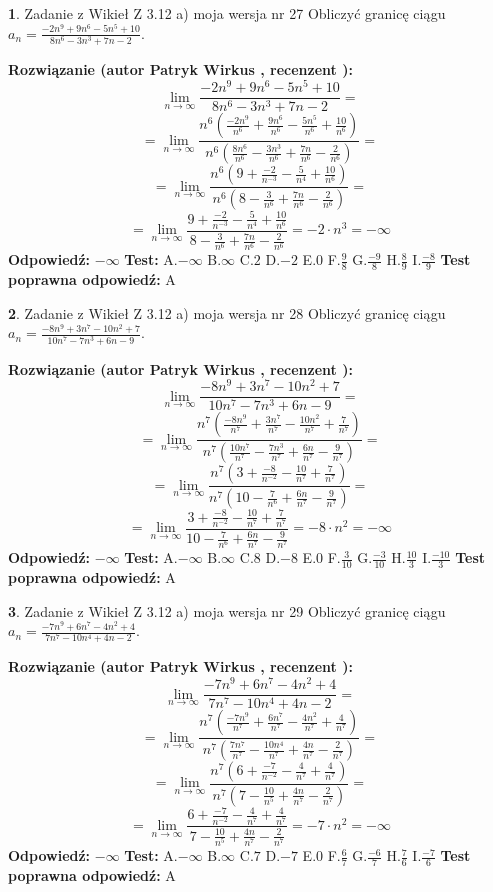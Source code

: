 \documentclass[12pt, a4paper]{article}
\theoremstyle{definition} %
\newtheorem{zad}{}
\newcommand{\zadStart}[1]{\begin{zad}#1\newline}
\newcommand{\zadStop}{\end{zad}}
\newcommand{\rozwStart}[2]{\noindent \textbf{Rozwiązanie (autor #1 , recenzent #2): }\newline}
\newcommand{\rozwStop}{\newline}
\newcommand{\odpStart}{\noindent \textbf{Odpowiedź:}\newline}
\newcommand{\odpStop}{\newline}
\newcommand{\testStart}{\noindent \textbf{Test:}\newline}
\newcommand{\testStop}{\newline}
\newcommand{\kluczStart}{\noindent \textbf{Test poprawna odpowiedź:}\newline}
\newcommand{\kluczStop}{\newline}
\begin{document}
\zadStart{Zadanie z Wikieł Z 3.12 a) moja wersja nr 27}
Obliczyć granicę ciągu $a_{n}=\frac{-2n^{9}+9n^{6}-5n^{5}+10}{8n^{6}-3n^{3}+7n-2}$.
\zadStop
\rozwStart{Patryk Wirkus}{}
$$\lim\limits_{n\to\infty}\frac{-2n^{9}+9n^{6}-5n^{5}+10}{8n^{6}-3n^{3}+7n-2}=$$
$$=\lim\limits_{n\to\infty}\frac{n^{6}\left(\frac{-2n^{9}}{n^{6}}+\frac{9n^{6}}{n^{6}}-\frac{5n^{5}}{n^{6}}+\frac{10}{n^{6}}\right)}{n^{6}\left(\frac{8n^{6}}{n^{6}}-\frac{3n^{3}}{n^{6}}+\frac{7n}{n^{6}}-\frac{2}{n^{6}}\right)}=$$
$$=\lim\limits_{n\to\infty}\frac{n^{6}\left(9+\frac{-2}{n^{-3}}-\frac{5}{n^{4}}+\frac{10}{n^{6}}\right)}
{n^{6}\left(8-\frac{3}{n^{6}}+\frac{7n}{n^{6}}-\frac{2}{n^{6}}\right)}=$$
$$=\lim\limits_{n\to\infty}\frac{9+\frac{-2}{n^{-3}}-\frac{5}{n^{4}}+\frac{10}{n^{6}}}{8-\frac{3}{n^{6}}+\frac{7n}{n^{6}}-\frac{2}{n^{6}}}=-2\cdot n^{3} = -\infty$$
\rozwStop
\odpStart
$-\infty$
\odpStop
\testStart
A.$-\infty$
B.$\infty$
C.$2$
D.$-2$
E.$0$
F.$\frac{9}{8}$
G.$\frac{-9}{8}$
H.$\frac{8}{9}$
I.$\frac{-8}{9}$
\testStop
\kluczStart
A
\kluczStop



\zadStart{Zadanie z Wikieł Z 3.12 a) moja wersja nr 28}
Obliczyć granicę ciągu $a_{n}=\frac{-8n^{9}+3n^{7}-10n^{2}+7}{10n^{7}-7n^{3}+6n-9}$.
\zadStop
\rozwStart{Patryk Wirkus}{}
$$\lim\limits_{n\to\infty}\frac{-8n^{9}+3n^{7}-10n^{2}+7}{10n^{7}-7n^{3}+6n-9}=$$
$$=\lim\limits_{n\to\infty}\frac{n^{7}\left(\frac{-8n^{9}}{n^{7}}+\frac{3n^{7}}{n^{7}}-\frac{10n^{2}}{n^{7}}+\frac{7}{n^{7}}\right)}{n^{7}\left(\frac{10n^{7}}{n^{7}}-\frac{7n^{3}}{n^{7}}+\frac{6n}{n^{7}}-\frac{9}{n^{7}}\right)}=$$
$$=\lim\limits_{n\to\infty}\frac{n^{7}\left(3+\frac{-8}{n^{-2}}-\frac{10}{n^{7}}+\frac{7}{n^{7}}\right)}
{n^{7}\left(10-\frac{7}{n^{6}}+\frac{6n}{n^{7}}-\frac{9}{n^{7}}\right)}=$$
$$=\lim\limits_{n\to\infty}\frac{3+\frac{-8}{n^{-2}}-\frac{10}{n^{7}}+\frac{7}{n^{7}}}{10-\frac{7}{n^{6}}+\frac{6n}{n^{7}}-\frac{9}{n^{7}}}=-8\cdot n^{2} = -\infty$$
\rozwStop
\odpStart
$-\infty$
\odpStop
\testStart
A.$-\infty$
B.$\infty$
C.$8$
D.$-8$
E.$0$
F.$\frac{3}{10}$
G.$\frac{-3}{10}$
H.$\frac{10}{3}$
I.$\frac{-10}{3}$
\testStop
\kluczStart
A
\kluczStop



\zadStart{Zadanie z Wikieł Z 3.12 a) moja wersja nr 29}
Obliczyć granicę ciągu $a_{n}=\frac{-7n^{9}+6n^{7}-4n^{2}+4}{7n^{7}-10n^{4}+4n-2}$.
\zadStop
\rozwStart{Patryk Wirkus}{}
$$\lim\limits_{n\to\infty}\frac{-7n^{9}+6n^{7}-4n^{2}+4}{7n^{7}-10n^{4}+4n-2}=$$
$$=\lim\limits_{n\to\infty}\frac{n^{7}\left(\frac{-7n^{9}}{n^{7}}+\frac{6n^{7}}{n^{7}}-\frac{4n^{2}}{n^{7}}+\frac{4}{n^{7}}\right)}{n^{7}\left(\frac{7n^{7}}{n^{7}}-\frac{10n^{4}}{n^{7}}+\frac{4n}{n^{7}}-\frac{2}{n^{7}}\right)}=$$
$$=\lim\limits_{n\to\infty}\frac{n^{7}\left(6+\frac{-7}{n^{-2}}-\frac{4}{n^{7}}+\frac{4}{n^{7}}\right)}
{n^{7}\left(7-\frac{10}{n^{5}}+\frac{4n}{n^{7}}-\frac{2}{n^{7}}\right)}=$$
$$=\lim\limits_{n\to\infty}\frac{6+\frac{-7}{n^{-2}}-\frac{4}{n^{7}}+\frac{4}{n^{7}}}{7-\frac{10}{n^{5}}+\frac{4n}{n^{7}}-\frac{2}{n^{7}}}=-7\cdot n^{2} = -\infty$$
\rozwStop
\odpStart
$-\infty$
\odpStop
\testStart
A.$-\infty$
B.$\infty$
C.$7$
D.$-7$
E.$0$
F.$\frac{6}{7}$
G.$\frac{-6}{7}$
H.$\frac{7}{6}$
I.$\frac{-7}{6}$
\testStop
\kluczStart
A
\kluczStop
\end{document}
